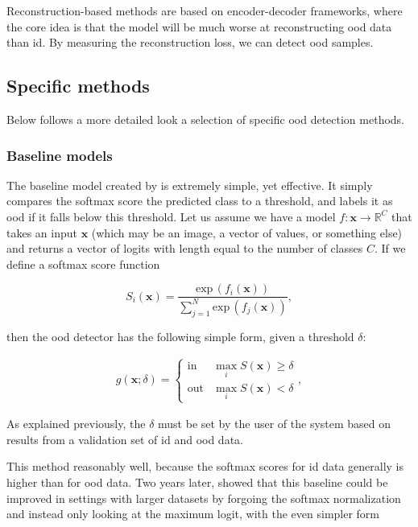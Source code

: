 \documentclass[UKenglish]{uiomasterthesis} %
\newcommand{\R}{\mathbb{R}}
\theoremstyle{definition}
\begin{document}
Reconstruction-based methods are based on encoder-decoder frameworks, where the core idea is that the model will be much worse at reconstructing \ac{ood} data than \ac{id}. By measuring the reconstruction loss, we can detect \ac{ood} samples.
\\

\subsection{Specific methods} \label{ood_specific}

Below follows a more detailed look a selection of specific \ac{ood} detection methods.

\subsubsection{Baseline models} \label{section:background_baselines}

The baseline model created by \cite{oodbaseline} is extremely simple, yet effective. It simply compares the softmax score the predicted class to a threshold, and labels it as \ac{ood} if it falls below this threshold. Let us assume we have a model $f: \bm{x} \rightarrow \R^C$ that takes an input $\bm{x}$ (which may be an image, a vector of values, or something else) and returns a vector of logits with length equal to the number of classes $C$. If we define a softmax score function 

\begin{equation}
    S_i(\bm{x}) = \frac{\text{exp} \, (f_i(\bm{x}))}{\sum^N_{j=1} \text{exp} \, (f_j(\bm{x}))},
\label{softmax}
\end{equation}

then the \ac{ood} detector has the following simple form, given a threshold $\delta$:

\begin{align}
\label{eq:msp}
    g(\bm{x}; \delta)=\begin{cases} 
        \text{in } & \max_i S(\bm{x})\ge \delta \\
        \text{out} & \max_i S(\bm{x}) < \delta 
   \end{cases},
\end{align}

As explained previously, the $\delta$ must be set by the user of the system based on results from a validation set of \ac{id} and \ac{ood} data.

This method reasonably well, because the softmax scores for \ac{id} data generally is higher than for \ac{ood} data. Two years later, \cite{mls} showed that this baseline could be improved in settings with larger datasets by forgoing the softmax normalization and instead only looking at the maximum logit, with the even simpler form
\end{document}
